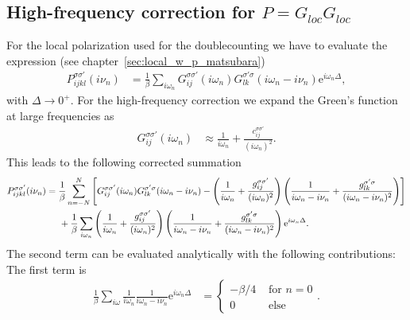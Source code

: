 \documentclass[12pt,a4paper]{scrartcl}
\numberwithin{equation}{section}
\begin{document}
\subsection{High-frequency correction for $P=G_{loc}G_{loc}$}
For the local polarization used for the doublecounting we have to evaluate
the expression (see chapter~\ref{sec:local_w_p_matsubara})
\begin{align}
 P^{\sigma\sigma'}_{ijkl}(i\nu_n)
%
 &=\frac{1}{\beta} \sum_{i\omega_n} G^{\sigma\sigma'}_{ij}(i\omega_n)
                     G^{\sigma'\sigma}_{lk}(i\omega_n-i\nu_n) \mathrm{e}^{i\omega_n\Delta},
\end{align}
with $\Delta \rightarrow 0^+$.
For the high-frequency correction we expand the Green's function
at large frequencies as
\begin{align}
 G^{\sigma\sigma'}_{ij}(i\omega_n)
 &\approx \frac{1}{i\omega_n} + \frac{c^{\sigma\sigma'}_{ij}}{(i\omega_n)^2}.
\end{align}
This leads to the following corrected summation
\begin{align}
 P^{\sigma\sigma'}_{ijkl}(i\nu_n)
%
 &=\frac{1}{\beta} \sum_{n=-N}^{N}\left[ G^{\sigma\sigma'}_{ij}(i\omega_n)
                                   G^{\sigma'\sigma}_{lk}(i\omega_n-i\nu_n)
           -\left( \frac{1}{i\omega_n} + \frac{g^{\sigma\sigma'}_{ij}}{(i\omega_n)^2}\right)
            \left(\frac{1}{i\omega_n-i\nu_n} + \frac{g^{\sigma'\sigma}_{lk}}{(i\omega_n-i\nu_n)^2}\right)\right] \nonumber \\
%
&\hspace{0.5cm}+ \frac{1}{\beta} \sum_{i\omega_n} 
            \left( \frac{1}{i\omega_n} + \frac{g^{\sigma\sigma'}_{ij}}{(i\omega_n)^2}\right)
            \left( \frac{1}{i\omega_n-i\nu_n} + \frac{g^{\sigma'\sigma}_{lk}}{(i\omega_n-i\nu_n)^2}\right)
             \mathrm{e}^{i\omega_n\Delta}.
\end{align}
The second term can be evaluated analytically with the following contributions:
The first term is
\begin{align}
\frac{1}{\beta} \sum_{i\omega} \frac{1}{i\omega_n}\frac{1}{i\omega_n-i\nu_n} \mathrm{e}^{i\omega_n\Delta}
&= \begin{cases}
    - \beta / 4 & \mbox{ for } n=0 \\
     0 & \mbox{ else}
   \end{cases}.
\end{align}
\end{document}
